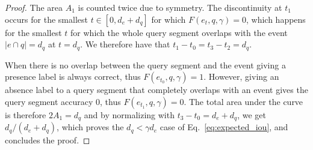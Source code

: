 \begin{proof}
The area $A_1$ is counted twice due to symmetry. The discontinuity at $t_1$ occurs for the smallest $t\in [0, d_e + d_q]$ for which $F(e_t, q, \gamma)=0$, which happens for the smallest $t$ for which the whole query segment overlaps with the event $|e \cap q| = d_q$ at $t=d_q$. We therefore have that $t_1 - t_0 = t_3 - t_2 = d_q$.

When there is no overlap between the query segment and the event giving a presence label is always correct, thus $F(e_{t_0}, q, \gamma) = 1$. However, giving an absence label to a query segment that completely overlaps with an event gives the query segment accuracy $0$, thus $F(e_{t_1}, q, \gamma) = 0$. The total area under the curve is therefore $2A_1 = d_q$ and by normalizing with $t_3-t_0 = d_e + d_q$, we get $d_q / (d_e + d_q)$, which proves the $d_q < \gamma d_e$ case of Eq.~\ref{eq:expected_iou}, and concludes the proof.

\end{proof}




